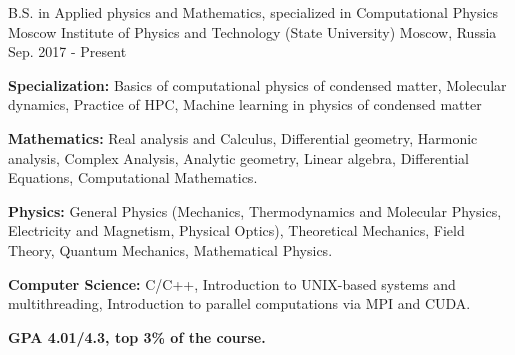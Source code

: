 

\begin{cventries}

  \cventry
    {B.S. in Applied physics and Mathematics, specialized in Computational Physics} %
    {Moscow Institute of Physics and Technology (State University)} %
    {Moscow, Russia} %
    {Sep. 2017 - Present} %
    {
      \begin{cvitems} %
        \item {\textbf{Specialization:} Basics of computational physics of condensed matter, Molecular dynamics, Practice of HPC, Machine learning in physics of condensed matter}
        \item {\textbf{Mathematics:} Real analysis and Calculus, Differential geometry, Harmonic analysis, Complex Analysis, Analytic geometry, Linear algebra, Differential Equations, Computational Mathematics.}
        \item {\textbf{Physics:} General Physics (Mechanics, Thermodynamics and Molecular Physics, Electricity and Magnetism, Physical Optics), Theoretical Mechanics, Field Theory, Quantum Mechanics, Mathematical Physics.}
        \item {\textbf{Computer Science:}  C/C++, Introduction to UNIX-based systems and multithreading, Introduction to parallel computations via MPI and CUDA.
		\item {\textbf{GPA 4.01/4.3, top 3\% of the course.}}        
}
      \end{cvitems}
    }

\end{cventries}
